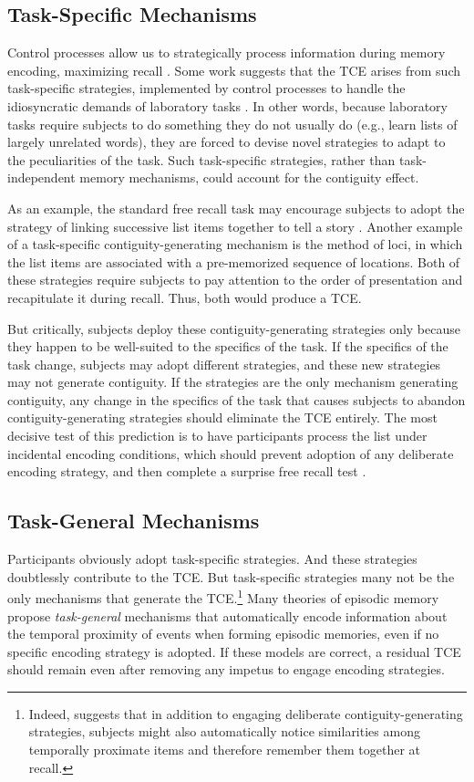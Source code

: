\documentclass[man,natbib,floatsintext]{apa6} %
\begin{document}
\subsection{Task-Specific Mechanisms}
Control processes \citep{LehmMalm13,AtkiShif68} allow us to strategically process information during memory encoding, maximizing recall \citep[e.g.,][]{Unsw16,DelaKnow05}. Some work suggests that the TCE arises from such task-specific strategies, implemented by control processes to handle the idiosyncratic demands of laboratory tasks \citep{Hint16}. In other words, because laboratory tasks require subjects to do something they do not usually do (e.g., learn lists of largely unrelated words), they are forced to devise novel strategies to adapt to the peculiarities of the task. Such task-specific strategies, rather than task-independent memory mechanisms, could account for the contiguity effect.

As an example, the standard free recall task may encourage subjects to adopt the strategy of linking successive list items together to tell a story \citep{DelaKnow05}. Another example of a task-specific contiguity-generating mechanism is the method of loci, in which the list items are associated with a pre-memorized sequence of locations. Both of these strategies require subjects to pay attention to the order of presentation and recapitulate it during recall. Thus, both would produce a TCE.

But critically, subjects deploy these contiguity-generating strategies only because they happen to be well-suited to the specifics of the task. If the specifics of the task change, subjects may adopt different strategies, and these new strategies may not generate contiguity.
If the strategies are the only mechanism generating contiguity, any change in the specifics of the task that causes subjects to abandon contiguity-generating strategies should eliminate the TCE entirely. The most decisive test of this prediction is to have participants process the list under incidental encoding conditions, which should prevent adoption of any deliberate encoding strategy, and then complete a surprise free recall test \citep{Hint16}.

\subsection{Task-General Mechanisms}
Participants obviously adopt task-specific strategies. And these strategies doubtlessly contribute to the TCE. But task-specific strategies many not be the only mechanisms that generate the TCE.\footnote{Indeed, \citet{Hint16} suggests that in addition to engaging deliberate contiguity-generating strategies, subjects might also automatically notice similarities among temporally proximate items and therefore remember them together at recall.} Many theories of episodic memory propose \emph{task-general} mechanisms that automatically encode information about the temporal proximity of events when forming episodic memories, even if no specific encoding strategy is adopted. If these models are correct, a residual TCE should remain even after removing any impetus to engage encoding strategies.
\end{document}
